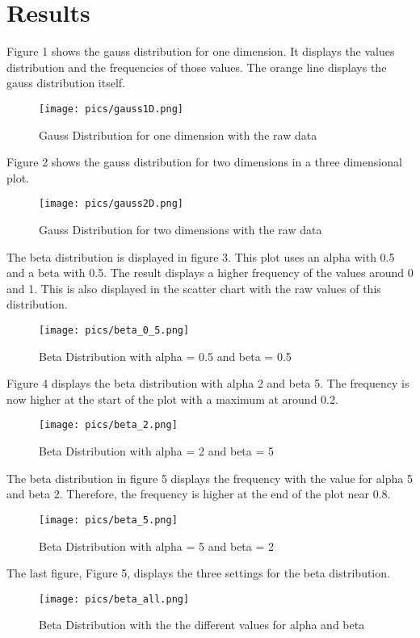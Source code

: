 \documentclass[10pt, a4paper, twocolumn]{article} %
\begin{document}
\section{Results}
Figure 1 shows the gauss distribution for one dimension. It displays the values distribution and the frequencies of those values. The orange line displays the gauss distribution itself.
\begin{figure}[htbp] %
  \centering
  \texttt{[image: pics/gauss1D.png]}
  \caption{Gauss Distribution for one dimension with the raw data}
  \label{fig:fibonacciPlot}
\end{figure}
Figure 2 shows the gauss distribution for two dimensions in a three dimensional plot.
\begin{figure}[htbp] %
  \centering
  \texttt{[image: pics/gauss2D.png]}
  \caption{Gauss Distribution for two dimensions with the raw data}
  \label{fig:fibonacciPlot}
\end{figure}
The beta distribution is displayed in figure 3. This plot uses an alpha with 0.5 and a beta with 0.5. The result displays a higher frequency of the values around 0 and 1. This is also displayed in the scatter chart with the raw values of this distribution. 
\begin{figure}[htbp] %
  \centering
  \texttt{[image: pics/beta\_0\_5.png]}
  \caption{Beta Distribution with alpha = 0.5 and beta = 0.5}
  \label{fig:fibonacciPlot}
\end{figure}
Figure 4 displays the beta distribution with alpha 2 and beta 5. The frequency is now higher at the start of the plot with a maximum at around 0.2.
\begin{figure}[htbp] %
  \centering
  \texttt{[image: pics/beta\_2.png]}
  \caption{Beta Distribution with alpha = 2 and beta = 5}
  \label{fig:fibonacciPlot}
\end{figure}
The beta distribution in figure 5 displays the frequency with the value for alpha 5 and beta 2. Therefore, the frequency is higher at the end of the plot near 0.8.
\begin{figure}[htbp] %
  \centering
  \texttt{[image: pics/beta\_5.png]}
  \caption{Beta Distribution with alpha = 5 and beta = 2}
  \label{fig:fibonacciPlot}
\end{figure}
The last figure, Figure 5, displays the three settings for the beta distribution. 
\begin{figure}[htbp] %
  \centering
  \texttt{[image: pics/beta\_all.png]}
  \caption{Beta Distribution with the the different values for alpha and beta}
  \label{fig:fibonacciPlot}
\end{figure}
\end{document}
